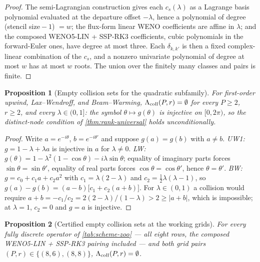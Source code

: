 \documentclass[pdflatex,sn-mathphys-num]{sn-jnl}%
\theoremstyle{thmstyleone}%
\newtheorem{proposition}{Proposition}%
\theoremstyle{thmstyletwo}%
\theoremstyle{thmstylethree}%
\begin{document}
\begin{proof}
The semi-Lagrangian construction gives each $c_s(\lambda)$ as a Lagrange basis polynomial evaluated at the departure offset $-\lambda$, hence a polynomial of degree (stencil size${}-1$) $=w$; the flux-form linear WENO coefficients are affine in $\lambda$; and the composed WENO5-LIN + SSP-RK3 coefficients, cubic polynomials in the forward-Euler ones, have degree at most three.
Each $\delta_{k,k'}$ is then a fixed complex-linear combination of the $c_s$, and a nonzero univariate polynomial of degree at most $w$ has at most $w$ roots.
The union over the finitely many classes and pairs is finite.
\end{proof}

\begin{proposition}[Empty collision sets for the quadratic subfamily]\label{prop:collision-empty}
For first-order upwind, Lax--Wendroff, and Beam--Warming, $\Lambda_{\rm coll}(P,r)=\emptyset$ for every $P\ge2$, $r\ge2$, and every $\lambda\in(0,1]$: the symbol $\theta\mapsto g(\theta)$ is injective on $[0,2\pi)$, so the distinct-node condition of \cref{thm:rank-universal} holds unconditionally.
\end{proposition}

\begin{proof}
Write $a=e^{-i\theta}$, $b=e^{-i\theta'}$ and suppose $g(a)=g(b)$ with $a\ne b$.
\emph{UW1:} $g=1-\lambda+\lambda a$ is injective in $a$ for $\lambda\ne0$.
\emph{LW:} $g(\theta)=1-\lambda^2(1-\cos\theta)-i\lambda\sin\theta$; equality of imaginary parts forces $\sin\theta=\sin\theta'$, equality of real parts forces $\cos\theta=\cos\theta'$, hence $\theta=\theta'$.
\emph{BW:} $g=c_0+c_1a+c_2a^2$ with $c_1=\lambda(2-\lambda)$ and $c_2=\tfrac12\lambda(\lambda-1)$, so $g(a)-g(b)=(a-b)\bigl[c_1+c_2(a+b)\bigr]$.
For $\lambda\in(0,1)$ a collision would require $a+b=-c_1/c_2=2(2-\lambda)/(1-\lambda)>2\ge|a+b|$, which is impossible; at $\lambda=1$, $c_2=0$ and $g=a$ is injective.
\end{proof}

\begin{proposition}[Certified empty collision sets at the working grids]\label{prop:collision-certificate}
For every fully discrete operator of \cref{tab:scheme-zoo} --- all eight rows, the composed WENO5-LIN + SSP-RK3 pairing included --- and both grid pairs $(P,r)\in\{(8,6),(8,8)\}$, $\Lambda_{\rm coll}(P,r)=\emptyset$.
\end{proposition}
\end{document}
